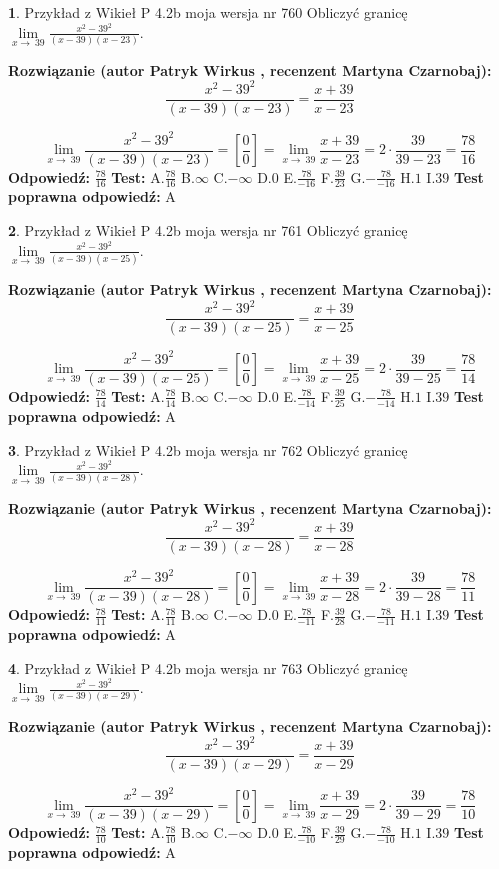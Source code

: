 \documentclass[12pt, a4paper]{article}
\theoremstyle{definition} %
\newtheorem{zad}{}
\newcommand{\zadStart}[1]{\begin{zad}#1\newline}
\newcommand{\zadStop}{\end{zad}}
\newcommand{\rozwStart}[2]{\noindent \textbf{Rozwiązanie (autor #1 , recenzent #2): }\newline}
\newcommand{\rozwStop}{\newline}
\newcommand{\odpStart}{\noindent \textbf{Odpowiedź:}\newline}
\newcommand{\odpStop}{\newline}
\newcommand{\testStart}{\noindent \textbf{Test:}\newline}
\newcommand{\testStop}{\newline}
\newcommand{\kluczStart}{\noindent \textbf{Test poprawna odpowiedź:}\newline}
\newcommand{\kluczStop}{\newline}
\begin{document}
\zadStart{Przykład z Wikieł P 4.2b moja wersja nr 760}
Obliczyć granicę $\lim\limits_{x\to\ 39}\frac{x^{2}-39^{2}}{(x-39)(x-23)}$.
\zadStop
\rozwStart{Patryk Wirkus}{Martyna Czarnobaj}
$$\frac{x^{2}-39^{2}}{(x-39)(x-23)}=\frac{x+39}{x-23}$$

$$\lim\limits_{x\to\ 39}\frac{x^{2}-39^{2}}{(x-39)(x-23)}=[\frac{0}{0}]=\lim\limits_{x\to\ 39}\frac{x+39}{x-23}=2 \cdot \frac{39}{39-23} = \frac{78}{16}$$
\rozwStop
\odpStart
$\frac{78}{16}$
\odpStop
\testStart
A.$\frac{78}{16}$
B.$\infty$
C.$-\infty$
D.$0$
E.$\frac{78}{-16}$
F.$\frac{39}{23}$
G.$-\frac{78}{-16}$
H.$1$
I.$39$
\testStop
\kluczStart
A
\kluczStop



\zadStart{Przykład z Wikieł P 4.2b moja wersja nr 761}
Obliczyć granicę $\lim\limits_{x\to\ 39}\frac{x^{2}-39^{2}}{(x-39)(x-25)}$.
\zadStop
\rozwStart{Patryk Wirkus}{Martyna Czarnobaj}
$$\frac{x^{2}-39^{2}}{(x-39)(x-25)}=\frac{x+39}{x-25}$$

$$\lim\limits_{x\to\ 39}\frac{x^{2}-39^{2}}{(x-39)(x-25)}=[\frac{0}{0}]=\lim\limits_{x\to\ 39}\frac{x+39}{x-25}=2 \cdot \frac{39}{39-25} = \frac{78}{14}$$
\rozwStop
\odpStart
$\frac{78}{14}$
\odpStop
\testStart
A.$\frac{78}{14}$
B.$\infty$
C.$-\infty$
D.$0$
E.$\frac{78}{-14}$
F.$\frac{39}{25}$
G.$-\frac{78}{-14}$
H.$1$
I.$39$
\testStop
\kluczStart
A
\kluczStop



\zadStart{Przykład z Wikieł P 4.2b moja wersja nr 762}
Obliczyć granicę $\lim\limits_{x\to\ 39}\frac{x^{2}-39^{2}}{(x-39)(x-28)}$.
\zadStop
\rozwStart{Patryk Wirkus}{Martyna Czarnobaj}
$$\frac{x^{2}-39^{2}}{(x-39)(x-28)}=\frac{x+39}{x-28}$$

$$\lim\limits_{x\to\ 39}\frac{x^{2}-39^{2}}{(x-39)(x-28)}=[\frac{0}{0}]=\lim\limits_{x\to\ 39}\frac{x+39}{x-28}=2 \cdot \frac{39}{39-28} = \frac{78}{11}$$
\rozwStop
\odpStart
$\frac{78}{11}$
\odpStop
\testStart
A.$\frac{78}{11}$
B.$\infty$
C.$-\infty$
D.$0$
E.$\frac{78}{-11}$
F.$\frac{39}{28}$
G.$-\frac{78}{-11}$
H.$1$
I.$39$
\testStop
\kluczStart
A
\kluczStop



\zadStart{Przykład z Wikieł P 4.2b moja wersja nr 763}
Obliczyć granicę $\lim\limits_{x\to\ 39}\frac{x^{2}-39^{2}}{(x-39)(x-29)}$.
\zadStop
\rozwStart{Patryk Wirkus}{Martyna Czarnobaj}
$$\frac{x^{2}-39^{2}}{(x-39)(x-29)}=\frac{x+39}{x-29}$$

$$\lim\limits_{x\to\ 39}\frac{x^{2}-39^{2}}{(x-39)(x-29)}=[\frac{0}{0}]=\lim\limits_{x\to\ 39}\frac{x+39}{x-29}=2 \cdot \frac{39}{39-29} = \frac{78}{10}$$
\rozwStop
\odpStart
$\frac{78}{10}$
\odpStop
\testStart
A.$\frac{78}{10}$
B.$\infty$
C.$-\infty$
D.$0$
E.$\frac{78}{-10}$
F.$\frac{39}{29}$
G.$-\frac{78}{-10}$
H.$1$
I.$39$
\testStop
\kluczStart
A
\kluczStop
\end{document}
